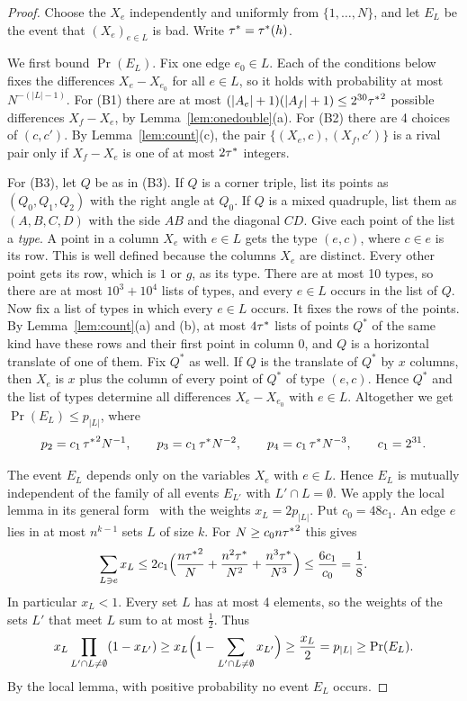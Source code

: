\begin{proof}
Choose the $X_e$ independently and uniformly from $\{1,\dots,N\}$, and let $E_L$ be the
event that $(X_e)_{e\in L}$ is bad. Write ${\tau^*}={\tau^*}(h)$.

We first bound $\Pr(E_L)$. Fix one edge $e_0\in L$. Each of the conditions below fixes the
differences $X_e-X_{e_0}$ for all $e\in L$, so it holds with probability at most
$N^{-(|L|-1)}$. For (B1) there are at most $(|A_e|+1)(|A_f|+1)\le2^{30}{\tau^*}^2$ possible
differences $X_f-X_e$, by Lemma~\ref{lem:onedouble}(a). For (B2) there are 4 choices of
$(c,c')$. By Lemma~\ref{lem:count}(c), the pair $\{(X_e,c),(X_f,c')\}$ is a rival pair only
if $X_f-X_e$ is one of at most $2{\tau^*}$ integers.

For (B3), let $Q$ be as in (B3). If $Q$ is a corner triple, list its points as
$(Q_0,Q_1,Q_2)$ with the right angle at $Q_0$. If $Q$ is a mixed quadruple, list them as
$(A,B,C,D)$ with the side $AB$ and the diagonal $CD$. Give each point of the list a
\emph{type}. A point in a column $X_e$ with $e\in L$ gets the type $(e,c)$, where $c\in e$
is its row. This is well defined because the columns $X_e$ are distinct. Every other point
gets its row, which is $1$ or $g$, as its type. There are at most 10 types, so there are at
most $10^3+10^4$ lists of types, and every $e\in L$ occurs in the list of $Q$. Now fix a
list of types in which every $e\in L$ occurs. It fixes the rows of the points. By
Lemma~\ref{lem:count}(a) and (b), at most $4{\tau^*}$ lists of points $Q^*$ of the same kind
have these rows and their first point in column $0$, and $Q$ is a horizontal translate of
one of them. Fix $Q^*$ as well. If $Q$ is the translate of $Q^*$ by $x$ columns, then $X_e$
is $x$ plus the column of every point of $Q^*$ of type $(e,c)$. Hence $Q^*$ and the list of
types determine all differences $X_e-X_{e_0}$ with $e\in L$. Altogether
we get $\Pr(E_L)\le p_{|L|}$, where
\[
 p_2=c_1\,{\tau^*}^2N^{-1},\qquad p_3=c_1\,{\tau^*} N^{-2},\qquad p_4=c_1\,{\tau^*} N^{-3},
 \qquad c_1=2^{31}.
\]

The event $E_L$ depends only on the variables $X_e$ with $e\in L$. Hence $E_L$ is mutually
independent of the family of all events $E_{L'}$ with $L'\cap L=\emptyset$. We apply the
local lemma in its general form~\cite[Lemma~5.1.1]{alonspencer2016} with the weights
$x_L=2p_{|L|}$. Put $c_0=48c_1$. An edge $e$ lies in at most $n^{k-1}$ sets $L$ of size $k$.
For $N\ge c_0n{\tau^*}^2$ this gives
\[
 \sum_{L\ni e}x_L\le2c_1\Bigl(\frac{n{\tau^*}^2}{N}+\frac{n^2{\tau^*}}{N^2}
 +\frac{n^3{\tau^*}}{N^3}\Bigr)\le\frac{6c_1}{c_0}=\frac18 .
\]
In particular $x_L<1$. Every set $L$ has at most 4 elements, so the weights of the sets
$L'$ that meet $L$ sum to at most $\frac12$. Thus
\[
 x_L\prod_{L'\cap L\ne\emptyset}(1-x_{L'})\ge x_L\Bigl(1-\sum_{L'\cap L\ne\emptyset}x_{L'}
 \Bigr)\ge\frac{x_L}2=p_{|L|}\ge\Pr(E_L).
\]
By the local lemma, with positive probability no event $E_L$ occurs.
\end{proof}

